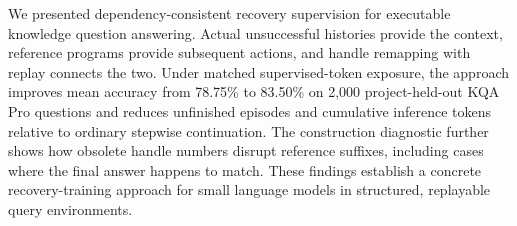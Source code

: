 We presented dependency-consistent recovery supervision for executable knowledge question answering. Actual unsuccessful histories provide the context, reference programs provide subsequent actions, and handle remapping with replay connects the two. Under matched supervised-token exposure, the approach improves mean accuracy from 78.75\% to 83.50\% on 2,000 project-held-out KQA Pro questions and reduces unfinished episodes and cumulative inference tokens relative to ordinary stepwise continuation. The construction diagnostic further shows how obsolete handle numbers disrupt reference suffixes, including cases where the final answer happens to match. These findings establish a concrete recovery-training approach for small language models in structured, replayable query environments.
